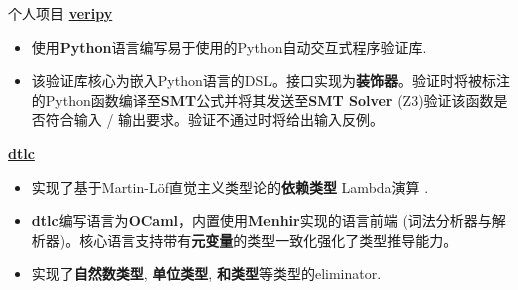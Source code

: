 \documentclass{resume}
\begin{document}
\begin{rSection}{个人项目}
		\textbf{\href{https://github.com/AD1024/veripy}{veripy}} %
		\vspace{-5pt}

		\begin{itemize}
			\setlength{\itemsep}{1pt}
            \setlength{\parskip}{0pt}
			\setlength{\parsep}{0pt}
			\item 使用\textbf{Python}语言编写易于使用的Python自动交互式程序验证库.
			\item 该验证库核心为嵌入Python语言的DSL。接口实现为\textbf{装饰器}。验证时将被标注的Python函数编译至\textbf{SMT}公式并将其发送至\textbf{SMT Solver} (Z3)验证该函数是否符合输入 / 输出要求。验证不通过时将给出输入反例。
		\end{itemize}

		\textbf{\href{https://github.com/AD1024/dtlc}{dtlc}} %
		\vspace{-5pt}

		\begin{itemize}
			\setlength{\itemsep}{1pt}
            \setlength{\parskip}{0pt}
			\setlength{\parsep}{0pt}
			\item 实现了基于Martin-Löf直觉主义类型论的\textbf{依赖类型} Lambda演算 .
			\item \textbf{dtlc}编写语言为\textbf{OCaml}，内置使用\textbf{Menhir}实现的语言前端 (词法分析器与解析器)。核心语言支持带有\textbf{元变量}的类型一致化强化了类型推导能力。
			\item 实现了\textbf{自然数类型}, \textbf{单位类型}, \textbf{和类型}等类型的eliminator.
		\end{itemize}


\end{rSection}
\end{document}
